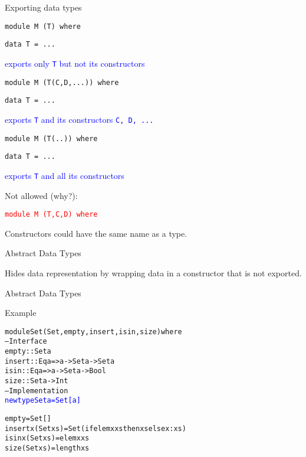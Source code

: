 \documentclass{beamer}
\def\code#1{\texttt{\frenchspacing#1}}
\begin{document}
\begin{frame}[fragile]{Exporting data types}

\code{module M (T) where} \par
\code{data T = ...} \par
\textcolor{blue}{exports only \code{T} but not its constructors}\pause

\vspace{0.25cm}
\code{module M (T(C,D,...)) where} \par
\code{data T = ...} \par
\textcolor{blue}{exports \code{T} and its constructors \code{C, D, ...}}\pause

\vspace{0.25cm}
\code{module M (T(..)) where} \par
\code{data T = ...} \par
\textcolor{blue}{exports \code{T} and all its constructors}\pause

\vspace{0.25cm}
Not allowed (why?): \par
\textcolor{red}{\code{module M (T,C,D) where}}

\pause

Constructors could have the same name as a type.

\end{frame}

\begin{frame}{Abstract Data Types}

\begin{block}{\centering Hides data representation by wrapping data in a constructor that is not exported.}
\end{block}

\end{frame}

\begin{frame}[fragile]{Abstract Data Types}

\begin{exampleblock}{Example}
\begin{alltt}
module Set (Set, empty, insert, isin, size) where
-- Interface
empty :: Set a
insert :: Eq a => a -> Set a -> Set a
isin :: Eq a => a -> Set a -> Bool
size :: Set a -> Int\pause
-- Implementation
\textcolor{blue}{newtype Set a = Set [a]}\pause

empty = Set []\pause
insert x (Set xs) = Set (if elem x xs then xs else x:xs)\pause
isin x (Set xs) = elem x xs\pause
size (Set xs) = length xs
\end{alltt}
\end{exampleblock}

\end{frame}
\end{document}

